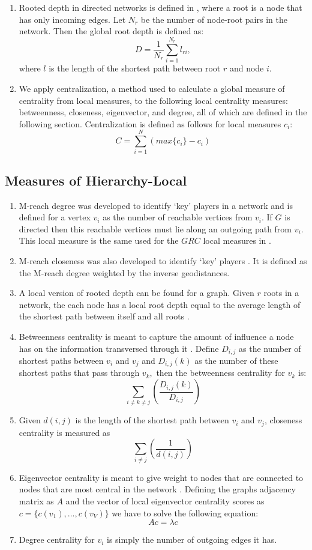 \documentclass[3p,times]{elsarticle}
\begin{document}
\begin{enumerate}
	\item Rooted depth in directed networks is defined in \cite{depth}, where a root is a node that has only incoming edges. Let $N_{r}$ be the number of node-root pairs in the network. Then the global root depth is defined as:
		$$
		D=\frac{1}{N_{r}}\sum_{i=1}^{N_r}{l_{ri}},	
		$$
		where $l$ is the length of the shortest path between root $r$ and node $i$.
	\item We apply centralization, a method used to calculate a global measure of centrality from local measures, to the following local centrality measures: betweenness, closeness, eigenvector, and degree, all of which are defined in the following section. Centralization is defined as follows for local measures $c_{i}$: 
	$$
	C=\sum_{i=1}^{N}{(max\{c_{i}\}-c_{i})}
	$$
\end{enumerate}

\subsection{Measures of Hierarchy-Local}
\begin{enumerate}
	\item M-reach degree was developed to identify `key' players in a network \cite{key} and is defined for a vertex $v_{i}$ as the number of reachable vertices from $v_{i}.$ If 
		$G$ is directed then this reachable vertices must lie along an outgoing path from $v_{i}$. This local measure is the same used for the $GRC$ local measures in \cite{GRC}.  
	\item M-reach closeness was also developed to identify `key' players \cite{key}. It is defined as the M-reach degree weighted by the inverse geodistances. 
	\item A local version of rooted depth can be found for a graph. Given $r$ roots in a network, the each node has a local root depth equal to the average length of the shortest path between itself and all roots \cite{depth}.
	\item Betweenness centrality is meant to capture the amount of influence a node has on the information transversed through it \cite{between}. Define $D_{i,j}$ as the number of shortest paths between $v_{i}$ and $v_{j}$ and $D_{i,j}(k)$ as the number of these shortest paths that pass through $v_{k},$ then the betweenness centrality for $v_{k}$ is:
		$$
		\sum_{i\neq k\neq j}{(\frac{D_{i,j}(k)}{D_{i,j}})}
		$$
	\item Given $d(i,j)$ is the length of the shortest path between $v_{i}$ and $v_{j}$, closeness centrality is measured as 
		$$
		\sum_{i\neq j}{(\frac{1}{d(i,j)})}
		$$
	\item Eigenvector centrality is meant to give weight to nodes that are connected to nodes that are most central in the network \cite{eigen}. Defining the graphs adjacency matrix 
		as $A$ and the vector of local eigenvector centrality scores as $c=\{c({v_{1}}),...,c(v_{V})\}$ we have to solve the following equation: 
		$$
			A c=\lambda c
		$$ 
	\item Degree centrality for $v_{i}$ is simply the number of outgoing edges it has.
\end{enumerate}
\end{document}
